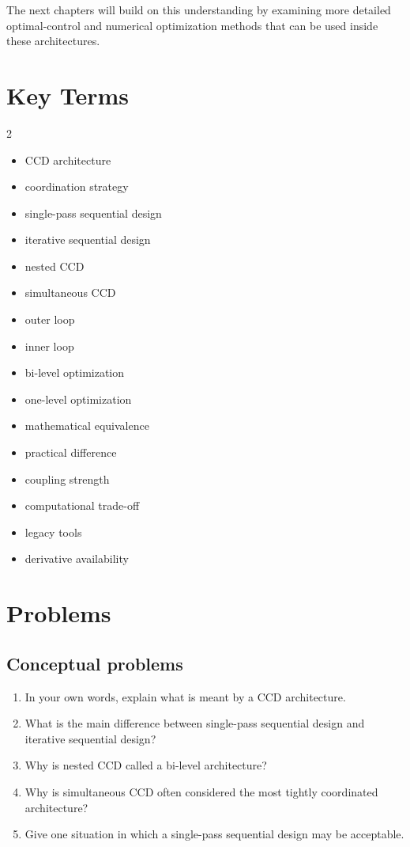 \documentclass[11pt]{article}
\begin{document}
The next chapters will build on this understanding by examining more detailed optimal-control and numerical optimization methods that can be used inside these architectures.

\section{Key Terms}

\begin{multicols}{2}
\begin{itemize}[leftmargin=1.4em,itemsep=0.25em]
  \item CCD architecture
  \item coordination strategy
  \item single-pass sequential design
  \item iterative sequential design
  \item nested CCD
  \item simultaneous CCD
  \item outer loop
  \item inner loop
  \item bi-level optimization
  \item one-level optimization
  \item mathematical equivalence
  \item practical difference
  \item coupling strength
  \item computational trade-off
  \item legacy tools
  \item derivative availability
\end{itemize}
\end{multicols}

\section{Problems}

\subsection*{Conceptual problems}
\begin{enumerate}[leftmargin=1.5em,label=\textbf{P\arabic*.}]
  \item In your own words, explain what is meant by a CCD architecture.
  \item What is the main difference between single-pass sequential design and iterative sequential design?
  \item Why is nested CCD called a bi-level architecture?
  \item Why is simultaneous CCD often considered the most tightly coordinated architecture?
  \item Give one situation in which a single-pass sequential design may be acceptable.
\end{enumerate}
\end{document}
